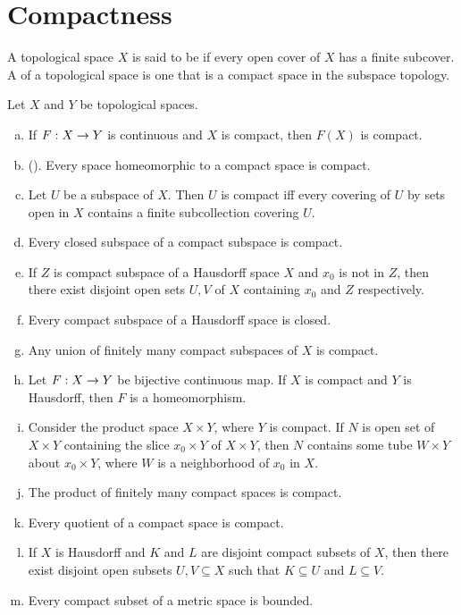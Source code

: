 \documentclass[11pt,a4paper]{article}
\begin{document}
\section{Compactness}

\begin{definition}
A topological space $X$ is said to be  if every open cover of $X$ has a finite subcover. A  of a topological space is one that is a compact space in the subspace topology.
\end{definition}

\begin{proposition} \label{prop:compact_spaces}
Let $X$ and $Y$ be topological spaces.
\begin{enumerate}[(a)]
    \item If $F:X\rightarrow Y$ is continuous and $X$ is compact, then $F(X)$ is compact.
    \item (). Every space homeomorphic to a compact space is compact.
    \item Let $U$ be a subspace of $X$. Then $U$ is compact iff every covering of $U$ by sets open in $X$ contains a finite subcollection covering $U$.
    \item Every closed subspace of a compact subspace is compact.
    \item If $Z$ is compact subspace of a Hausdorff space $X$ and $x_0$ is not in $Z$, then there exist disjoint open sets $U,V$ of $X$ containing $x_0$ and $Z$ respectively.
    \item Every compact subspace of a Hausdorff space is closed.
    \item Any union of finitely many compact subspaces of $X$ is compact.
    \item Let $F:X\rightarrow Y$ be bijective continuous map. If $X$ is compact and $Y$ is Hausdorff, then $F$ is a homeomorphism.
    \item {} Consider the product space $X\times Y$, where $Y$ is compact. If $N$ is open set of $X\times Y$ containing the slice $x_0\times Y$ of $X\times Y$, then $N$ contains some tube $W\times Y$ about $x_0\times Y$, where $W$ is a neighborhood of $x_0$ in $X$.
    \item The product of finitely many compact spaces is compact.
    \item Every quotient of a compact space is compact.
    \item If $X$ is Hausdorff and $K$ and $L$ are disjoint compact subsets of $X$, then there exist disjoint open subsets $U,V\subseteq X$ such that $K\subseteq U$ and $L\subseteq V$.
    \item Every compact subset of a metric space is bounded.
\end{enumerate}
\end{proposition}
\end{document}
